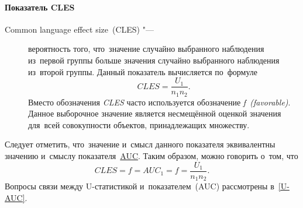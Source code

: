 \documentclass[]{scrartcl}
\begin{document}
\paragraph{Показатель CLES}
\begin{description}
		\item[Common language effect size~(CLES) "---] вероятность того, что~значение случайно выбранного наблюдения из~первой группы больше значения случайно выбранного наблюдения из~второй группы. Данный показатель вычисляется по~формуле
		\begin{equation}\label{eq:CLES}
		CLES = \frac{U_{1}}{n_{1}n_{2}}.
		\end{equation}
		Вместо обозначения \textit{CLES} часто используется обозначение \textit{f~(favorable)}. Данное выборочное значение является несмещённой оценкой значения для~всей совокупности объектов, принадлежащих множеству.
\end{description}
Следует отметить, что~значение и~смысл данного показателя эквивалентны значению и~смыслу показателя~\href{https://en.wikipedia.org/wiki/Receiver_operating_characteristic}{AUC}\cite{Wiki:ROC}. Таким образом, можно говорить о~том, что
\begin{equation}\label{eq:AUC}
CLES = f = AUC_{1} = f = \frac{U_{1}}{n_{1}n_{2}}.
\end{equation}
Вопросы связи между U-статистикой и~показателем~(AUC) рассмотрены в~\ref{U-AUC}.
\end{document}
